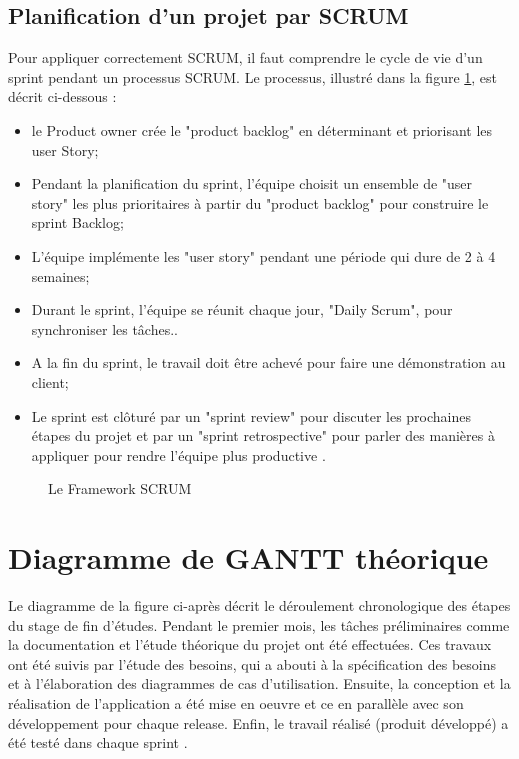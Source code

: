 \subsection{Planification d’un projet par SCRUM}
Pour appliquer correctement SCRUM, il faut comprendre le cycle de vie d’un sprint pendant un processus SCRUM. Le processus, illustré dans la figure \ref{fig:FrameworkScrum }, est décrit ci-dessous :
 \begin{itemize}
    \item le Product owner crée le "product backlog" en déterminant et priorisant les user Story;
    \item Pendant la planification du sprint, l’équipe choisit un ensemble de "user story" les plus prioritaires à partir du "product backlog" pour construire le sprint Backlog;
    \item L’équipe implémente les "user story" pendant une période qui dure de 2 à 4 semaines;
    \item Durant le sprint, l’équipe se réunit chaque jour, "Daily Scrum", pour synchroniser les tâches..
    \item A la fin du sprint, le travail doit être achevé pour faire une démonstration au client;
    \item Le sprint est clôturé par un "sprint review" pour discuter les prochaines étapes du projet et par un "sprint retrospective" pour parler des manières à appliquer pour rendre l’équipe plus productive \cite{scrum}.
    \end{itemize}
    
              \begin{figure}[htpb]
\centering
{}
\caption{Le Framework SCRUM}
\label{fig:FrameworkScrum }
\end{figure}
\newpage
   \section{Diagramme de GANTT théorique}
    Le diagramme de la figure ci-après décrit le déroulement chronologique des étapes du stage de fin d'études. Pendant le premier mois, les tâches préliminaires comme la documentation et l’étude théorique du projet ont été effectuées. Ces travaux ont été suivis par l’étude des besoins, qui a abouti à la spécification des besoins et à l’élaboration des diagrammes de cas d’utilisation. Ensuite, la conception et la réalisation de l’application a été mise en oeuvre et ce en parallèle avec son développement pour chaque release. Enfin, le travail réalisé (produit développé) a été testé dans chaque sprint .\\
  
